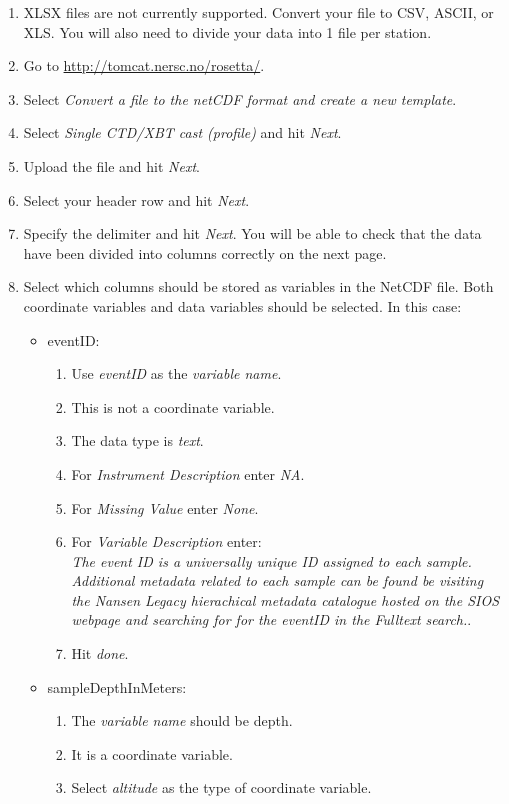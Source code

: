 \documentclass[a4paper,english, 11pt]{article}
\begin{document}
\begin{enumerate}
\item XLSX files are not currently supported. Convert your file to CSV, ASCII, or XLS. You will also need to divide your data into 1 file per station.
\item Go to \url{http://tomcat.nersc.no/rosetta/}.
\item Select \textit{Convert a file to the netCDF format and create a new template}.
\item Select \textit{Single CTD/XBT cast (profile)} and hit \textit{Next}.
\item Upload the file and hit \textit{Next}.
\item Select your header row and hit \textit{Next}.
\item Specify the delimiter and hit \textit{Next}. You will be able to check that the data have been divided into columns correctly on the next page.
\item Select which columns should be stored as variables in the NetCDF file. Both coordinate variables and data variables should be selected. In this case:
\begin{itemize}
\item eventID:
\begin{enumerate}
\item Use \textit{eventID} as the \textit{variable name}.
\item This is not a coordinate variable.
\item The data type is \textit{text}. 
\item For \textit{Instrument Description} enter \textit{NA}.
\item For \textit{Missing Value} enter \textit{None}.
\item For \textit{Variable Description} enter:\\
\textit{The event ID is a universally unique ID assigned to each sample. Additional metadata related to each sample can be found be visiting the Nansen Legacy hierachical metadata catalogue hosted on the SIOS webpage and searching for for the eventID in the Fulltext search.}.
\item Hit \textit{done}.
\end{enumerate}
\item sampleDepthInMeters:
\begin{enumerate}
\item The \textit{variable name} should be depth.
\item It is a coordinate variable.
\item Select \textit{altitude} as the type of coordinate variable.

\end{enumerate}
\end{itemize}
\end{enumerate}
\end{document}
